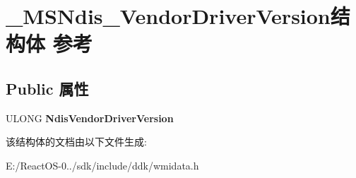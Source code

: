 \hypertarget{struct___m_s_ndis___vendor_driver_version}{}\section{\+\_\+\+M\+S\+Ndis\+\_\+\+Vendor\+Driver\+Version结构体 参考}
\label{struct___m_s_ndis___vendor_driver_version}
\subsection*{Public 属性}
\begin{DoxyCompactItemize}
\item 
\mbox{\label{struct___m_s_ndis___vendor_driver_version_aa9fcea2d3fb5aa0430cfa0f26151f88b}} 
U\+L\+O\+NG {\bfseries Ndis\+Vendor\+Driver\+Version}
\end{DoxyCompactItemize}


该结构体的文档由以下文件生成\+:\begin{DoxyCompactItemize}
\item 
E\+:/\+React\+O\+S-\/0../sdk/include/ddk/wmidata.\+h\end{DoxyCompactItemize}
